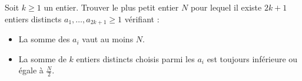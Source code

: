 Soit $k\ge 1$ un entier. Trouver le plus petit entier $N$ pour lequel il existe $2k + 1$ entiers distincts $a_1, \dots, a_{2k + 1} \ge 1$ vérifiant :
\begin{itemize}
\item La somme des $a_i$ vaut au moins $N$.
\item La somme de $k$ entiers distincts choisis parmi les $a_i$ est toujours inférieure ou égale à $\frac{N}2$.
\end{itemize}